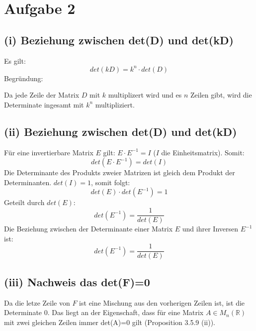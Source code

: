 \documentclass{article}
\begin{document}
\section{Aufgabe 2}

\subsection{(i) Beziehung zwischen det(D) und det(kD)}
Es gilt:
\[det(kD) = k^n \cdot det(D)\]
Begründung:
\begin{center}
    Da jede Zeile der Matrix $D$ mit $k$ multiplizert wird und es $n$ Zeilen gibt, wird die Determinate ingesamt mit $k^n$ multipliziert. 
\end{center}

\subsection{(ii) Beziehung zwischen det(D) und det(kD)}
Für eine invertierbare Matrix $E$ gilt: $E \cdot E^{-1}=I$ ($I$ die Einheitsmatrix). Somit:
\[det(E \cdot E^{-1})=det(I)\]
Die Determinante des Produkts zweier Matrizen ist gleich dem Produkt der Determinanten. $det(I)=1$, somit folgt:
\[det(E) \cdot det(E^{-1})=1\]
Geteilt durch $det(E)$:
\[det(E^{-1})=\frac{1}{det(E)}\]
Die Beziehung zwischen der Determinante einer Matrix $E$ und ihrer Inversen $E^{-1}$ ist:
\[det(E^{-1})=\frac{1}{det(E)}\]

\subsection{(iii) Nachweis das det(F)=0} 
\begin{center}
    Da die letze Zeile von $F$ ist eine Mischung aus den vorherigen Zeilen ist, ist die Determinate 0. Das liegt an der Eigenschaft, dass für eine Matrix $A \in M_n(\mathbb{R})$ mit zwei gleichen Zeilen immer det(A)=0 gilt (Proposition 3.5.9 (ii)).
\end{center}
\end{document}
